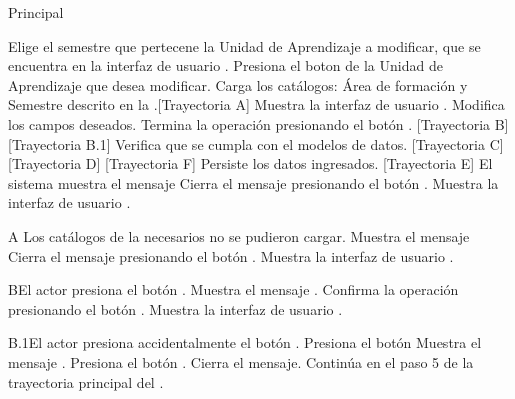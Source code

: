 \begin{UCtrayectoria}{Principal}

	\UCpaso[\UCactor] Elige el semestre que pertecene la Unidad de Aprendizaje a modificar, que se encuentra en la interfaz de usuario .
	\UCpaso[\UCactor] Presiona el boton  de la Unidad de Aprendizaje que desea modificar.
	\UCpaso Carga los catálogos: Área de formación y Semestre descrito en la .[Trayectoria A]
	\UCpaso Muestra la interfaz de usuario .
	\UCpaso[\UCactor] Modifica los campos deseados.
	\UCpaso[\UCactor] Termina la operación presionando el botón . [Trayectoria B] [Trayectoria B.1]
	\UCpaso Verifica que se cumpla con el modelos de datos. [Trayectoria C] [Trayectoria D] [Trayectoria F]
	\UCpaso Persiste los datos ingresados. [Trayectoria E]
	\UCpaso El sistema muestra el mensaje 
	\UCpaso[\UCactor] Cierra el mensaje presionando el botón .
	\UCpaso Muestra la interfaz de usuario  .
\end{UCtrayectoria}

\begin{UCtrayectoriaA}{A}{ Los catálogos de la  necesarios no se pudieron cargar.}
	\UCpaso Muestra el mensaje 
	\UCpaso[\UCactor] Cierra el mensaje presionando el botón .
	\UCpaso Muestra la interfaz de usuario .
\end{UCtrayectoriaA}

\begin{UCtrayectoriaA}{B}{El actor presiona el botón .}
	\UCpaso Muestra el mensaje .
	\UCpaso[\UCactor] Confirma la operación presionando el botón .
	\UCpaso Muestra la interfaz de usuario .
\end{UCtrayectoriaA}

\begin{UCtrayectoriaA}{B.1}{El actor presiona accidentalmente el botón .}
	\UCpaso[\UCactor] Presiona el botón 
	\UCpaso Muestra el mensaje .
	\UCpaso[\UCactor] Presiona el botón .
	\UCpaso Cierra el mensaje.
	\UCpaso Continúa en el paso 5 de la trayectoria principal del .
\end{UCtrayectoriaA}

